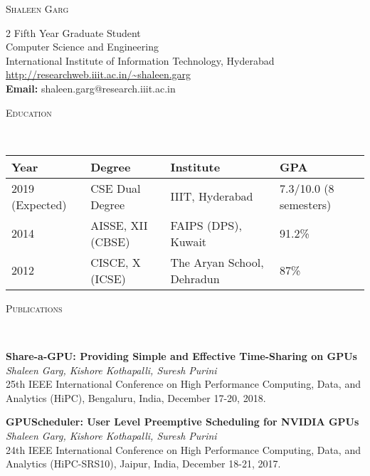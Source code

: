 \documentclass[10pt]{article}
\newenvironment{changemargin}[2]{%
    \begin{list}{}{%
            \setlength{\topsep}{0pt}%
            \setlength{\leftmargin}{#1}%
            \setlength{\rightmargin}{#2}%
            \setlength{\listparindent}{\parindent}%
        \setlength{\itemindent}{\parindent}%
            \setlength{\parsep}{\parskip}%
        }%
\item[]}{\end{list}
}
\newcommand{\lineover}{
    \begin{changemargin}{-0.05in}{-0.10in}
        \vspace*{-8pt}
        \hrulefill \\
        \vspace*{-2pt}
    \end{changemargin}
}
\newcommand{\header}[1]{
    \begin{changemargin}{-0.75in}{-0.75in}
        \scshape{#1}\\
        \lineover
    \end{changemargin}
}
\newcommand{\name}[1]{
    \begin{changemargin}{-0.6in}{-0.6in}
        \begin{center}
            {\Large \scshape {#1}}
        \end{center}
    \end{changemargin}
}
\newcommand{\contact}[6]{
    \begin{changemargin}{-0.65in}{-0.65in}
        \begin{multicols}{2}
            {#1}\\ \smallskip 
            {#2}\\ \smallskip
            {#3}\\ \smallskip
            {#4}\\ \smallskip 
            {#5}\\ \smallskip
            {#6}
        \end{multicols}
    \end{changemargin}
}
\newenvironment{body} {
    \vspace*{-16pt}
    \begin{changemargin}{-0.6in}{-0.65in}
    }     
    {\end{changemargin}
}
\begin{document}
\name{Shaleen Garg}

\contact{Fifth Year Graduate Student}{Computer Science and Engineering}{International Institute of Information Technology, Hyderabad}{\hspace{60pt} \url{http://researchweb.iiit.ac.in/~shaleen.garg}}{\hspace{60pt} \textbf{Email:} shaleen.garg@research.iiit.ac.in}{\hspace{60pt} }%

\header{Education}

\vspace{2pt}
\begin{center}
\begin{tabular}{|l|l|l|l|}
    \hline     
    \textbf{Year} & \textbf{Degree} & \textbf{Institute} & \textbf{GPA} \\ \hline
    2019 (Expected) & CSE Dual Degree & IIIT, Hyderabad & 7.3/10.0 (8 semesters) \\ \hline
    2014 & AISSE, XII (CBSE) & FAIPS (DPS), Kuwait & 91.2\% \\ \hline
    2012 & CISCE, X (ICSE) & The Aryan School, Dehradun  & 87\% \\ \hline
\end{tabular}
\end{center}
\smallskip

\smallskip
\header{Publications}

\begin{body}
    \vspace{14pt}
    \textbf{Share-a-GPU: Providing Simple and Effective Time-Sharing on GPUs}\\
    \emph{Shaleen Garg, Kishore Kothapalli, Suresh Purini}\\
    25th IEEE International Conference on High Performance Computing, Data, and Analytics (HiPC), Bengaluru, India, December 17-20, 2018.
    \smallskip 
\end{body}

\begin{body}
    \vspace{14pt}
    \textbf{GPUScheduler: User Level Preemptive Scheduling for NVIDIA GPUs}\\
    \emph{Shaleen Garg, Kishore Kothapalli, Suresh Purini}\\
    24th IEEE International Conference on High Performance Computing, Data, and Analytics (HiPC-SRS10), Jaipur, India, December 18-21, 2017.
    \smallskip 
\end{body}
\end{document}
